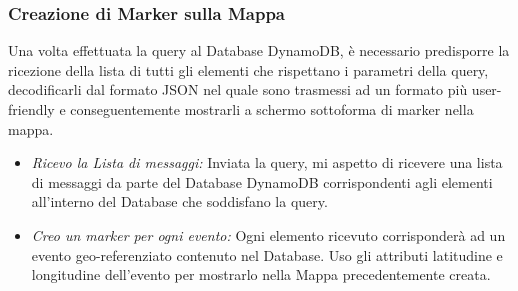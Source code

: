 \subsubsection{Creazione di Marker sulla Mappa}
Una volta effettuata la query al Database DynamoDB, è necessario predisporre la ricezione della lista di tutti gli elementi che rispettano i parametri della query, decodificarli dal formato JSON nel quale sono trasmessi ad un formato più user-friendly e conseguentemente mostrarli a schermo sottoforma di marker nella mappa.
\begin{itemize}
	\item \textit{Ricevo la Lista di messaggi:} Inviata la query, mi aspetto di ricevere una lista di messaggi da parte del Database DynamoDB corrispondenti agli elementi all'interno del Database che soddisfano la query. 
	
	
	\item \textit{Creo un marker per ogni evento:} Ogni elemento ricevuto corrisponderà ad un evento geo-referenziato contenuto nel Database. Uso gli attributi latitudine e longitudine dell'evento per mostrarlo nella Mappa precedentemente creata.
	
\end{itemize}

